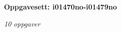 \centerline{\bf Oppgavesett: i01470no-i01479no}
\vskip 10pt
\centerline{\it 10 oppgaver}\vskip 10pt
\vskip 10pt
